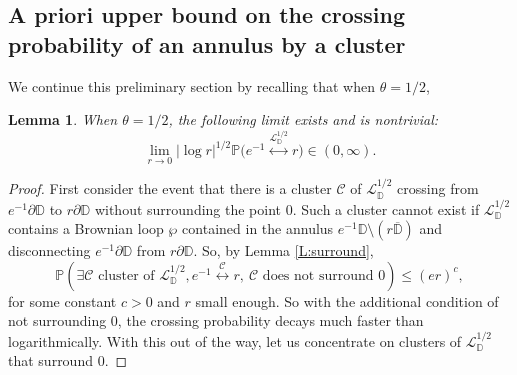 \documentclass[11pt]{article}
\newtheorem{lemma}[theorem]{Lemma}
\theoremstyle{remark}
\newcommand{\D}{\mathbb{D}}
\newcommand{\Cc}{\mathcal{C}}
\newcommand{\Lc}{\mathcal{L}}
\newcommand{\Prob}[1]{\mathbb{P} \left( #1 \right) }
\renewcommand{\P}{\mathbb{P}}
\numberwithin{equation}{section}
\begin{document}
\subsection{A priori upper bound on the crossing probability of an annulus by a cluster}


We continue this preliminary section by recalling that when $\theta = 1/2$,

\begin{lemma}\label{L:theta=1/2}
When $\theta = 1/2$, the following limit exists and is nontrivial:
\[
\lim_{r \to 0} |\log r|^{1/2} \P \Big( e^{-1} \overset{\Lc_\D^{1/2}}{\longleftrightarrow} r \Big)
\in (0,\infty).
\]
\end{lemma}

\begin{proof}
First consider the event that there is a cluster $\Cc$ of
$\Lc_\D^{1/2}$ crossing from $e^{-1}\partial\D$
to $r\partial\D$ without surrounding the point $0$.
Such a cluster cannot exist if $\Lc_\D^{1/2}$ contains a Brownian loop $\wp$
contained in the annulus $e^{-1}\D\setminus (r\overline{\D})$
and disconnecting $e^{-1}\partial\D$ from $r\partial\D$.
So, by Lemma \ref{L:surround},
\[
\Prob{\exists \Cc 
\text{ cluster of }
\Lc_\D^{1/2},
e^{-1} \overset{\Cc}{\longleftrightarrow} r,~
\Cc \text{ does not surround } 0
}
\leq (e r)^{c},
\]
for some constant $c>0$ and $r$ small enough. 
So with the additional condition of not surrounding $0$,
the crossing probability decays much faster than logarithmically.
With this out of the way, let us concentrate on clusters of 
$\Lc_\D^{1/2}$ that surround $0$.


\end{proof}
\end{document}
